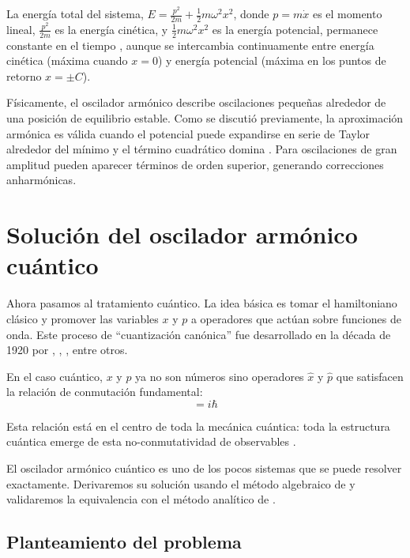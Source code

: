 La energía total del sistema, $E = \frac{p^2}{2m} + \frac{1}{2}m\omega^2 x^2$, donde $p = m\dot{x}$ es el momento lineal,
$\frac{p^2}{2m}$ es la energía cinética,
y $\frac{1}{2}m\omega^2 x^2$ es la energía potencial,
permanece constante en el tiempo \citep{hamilton1834}, aunque se intercambia continuamente entre energía cinética (máxima cuando $x=0$) y energía potencial (máxima en los puntos de retorno $x=\pm C$).

Físicamente, el oscilador armónico describe oscilaciones pequeñas alrededor de una posición de equilibrio estable. Como se discutió previamente, la aproximación armónica es válida cuando el potencial puede expandirse en serie de Taylor alrededor del mínimo y el término cuadrático domina \citep{newton1687, hamilton1834}. Para oscilaciones de gran amplitud pueden aparecer términos de orden superior, generando correcciones anharmónicas.

\section{Solución del oscilador armónico cuántico}
	
Ahora pasamos al tratamiento cuántico. La idea básica es tomar el hamiltoniano clásico y promover las variables $x$ y $p$ a operadores que actúan sobre funciones de onda. Este proceso de ``cuantización canónica'' fue desarrollado en la década de 1920 por \cite{schrodinger1926a}, \cite{heisenberg1925}, \cite{born1925, bornheisenberg1926}, entre otros.

En el caso cuántico, $x$ y $p$ ya no son números sino operadores $\hat{x}$ y $\hat{p}$ que satisfacen la relación de conmutación fundamental:
\vspace{-15pt}	
\begin{equation}
[\hat{x},\hat{p}] = i\hbar
\end{equation}

Esta relación está en el centro de toda la mecánica cuántica: toda la estructura cuántica emerge de esta no-conmutatividad de observables \citep{bornheisenberg1926}.

El oscilador armónico cuántico es uno de los pocos sistemas que se puede resolver exactamente. Derivaremos su solución usando el método algebraico de \cite{dirac1925} y validaremos la equivalencia con el método analítico de \cite{schrodinger1926a}.

\subsection{Planteamiento del problema}
	
